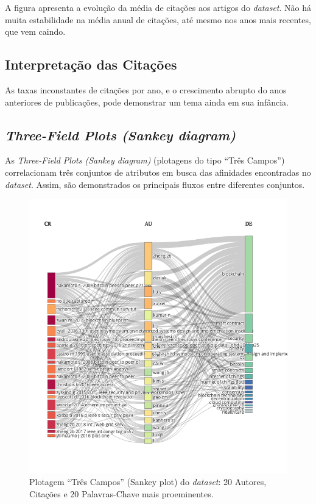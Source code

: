 A figura apresenta a evolução da média de citações aos artigos do \textit{dataset}. Não há muita estabilidade na média anual de citações, até mesmo nos anos mais recentes, que vem caindo.

\subsection{Interpretação das Citações}
As taxas inconstantes de citações por ano, e o crescimento abrupto do anos anteriores de publicações, pode demonstrar um tema ainda em sua infância.
\subsection{\textit{Three-Field Plots (Sankey diagram)}}

As \textit{Three-Field Plots (Sankey diagram)} (plotagens do tipo ``Três Campos'') correlacionam três conjuntos de atributos em busca das afinidades encontradas no \textit{dataset}. Assim, são demonstrados os principais fluxos entre diferentes conjuntos.

\begin{figure}
    \centering
    \includegraphics[width=1\textwidth]{experiments/Jaxiii/PesquisaBibliometrica/Blockchains/ThreeFieldPlot.png}
    \caption{Plotagem ``Três Campos'' (Sankey plot) do \textit{dataset}: 20 Autores, Citações e 20 Palavras-Chave mais proeminentes.}
    \label{fig:blockchain@Jaxiii:ThreeFieldPlot}
\end{figure}

